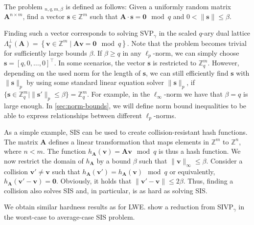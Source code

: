\begin{definition}
    The problem $_{n, q, m, \beta}$ is defined as follows: Given a uniformly random matrix $\mathbf{A}^{n\times m}$, find a vector $\mathbf{s} \in \mathbb{Z}^m$ such that $\mathbf{A} \cdot \mathbf{s} = \mathbf{0} \mod q$ and $0 < \| \mathbf{s}\| \leq \beta$.
\end{definition}

Finding such a vector corresponds to solving SVP$_\gamma$ in the scaled $q$-ary dual lattice $\Lambda_q^\perp(\mathbf{A}) = \left\{ \mathbf{v} \in \mathbb{Z}^m \mid  \mathbf{A}\mathbf{v} = \mathbf{0} \mod q \right\}$. Note that the problem becomes trivial for sufficiently large bounds $\beta$. If $\beta\geq q$ in any $\ell_p$-norm, we can simply choose $\mathbf{s} = [q, 0, \dots, 0]^\intercal$. In some scenarios, the vector $\mathbf{s}$ is restricted to $\mathbb{Z}_q^m$. However, depending on the used norm for the length of $\mathbf{s}$, we can still efficiently find $\mathbf{s}$ with $\|\mathbf{s}\|_p$ by using some standard linear equation solver $\|\mathbf{s}\|_p$, if $\{\mathbf{s}\in \mathbb{Z}_q^m \mid \|\mathbf{s}'\|_p \leq \beta\} = \mathbb{Z}_q^m$. For example, in the $\ell_\infty$-norm we have that $\beta=q$ is large enough. In \cref{sec:norm-bounds}, we will define norm bound inequalities to be able to express relationships between different $\ell_p$-norms.

As a simple example, SIS can be used to create collision-resistant hash functions. The matrix $\mathbf{A}$ defines a linear transformation that maps elements in  $\mathbb{Z}^m$ to  $\mathbb{Z}^n$, where $n < m$. The function $h_\mathbf{A}(\mathbf{v}) = \mathbf{A} \mathbf{v} \mod q$ is thus a hash function. We now restrict the domain of $h_\mathbf{A}$ by a bound $\beta$ such that $\|\mathbf{v}\|_\infty \leq \beta$. Consider a collision $\mathbf{v}' \neq \mathbf{v}$ such that $h_\mathbf{A}(\mathbf{v}') = h_\mathbf{A}(\mathbf{v}) \mod q$ or equivalently, $h_\mathbf{A}(\mathbf{v}' - \mathbf{v}) = \mathbf{0}$. Obviously, it holds that $\|\mathbf{v}' - \mathbf{v}\| \leq 2\beta$. Thus, finding a collision also solves SIS and, in particular, is as hard as solving SIS.

We obtain similar hardness results as for LWE.  \citet{MR04} show a reduction from SIVP$_\gamma$ in the worst-case to average-case SIS problem.

